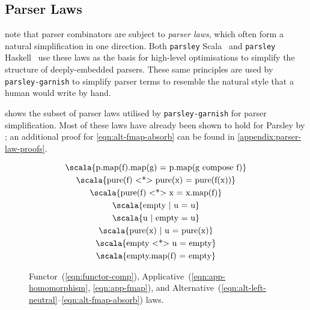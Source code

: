 \documentclass[../../../main.tex]{subfiles}
\begin{document}
\subsection{Parser Laws}
\textcite{willis_staged_2023} note that parser combinators are subject to \emph{parser laws}, which often form a natural simplification in one direction.
Both \texttt{parsley} Scala~\cite{willis_garnishing_2018} and \texttt{parsley} Haskell~\cite{willis_parsley_2023} use these laws as the basis for high-level optimisations to simplify the structure of deeply-embedded parsers.
These same principles are used by \texttt{parsley-garnish} to simplify parser terms to resemble the natural style that a human would write by hand.

 shows the subset of parser laws utilised by \texttt{parsley-garnish} for parser simplification.
Most of these laws have already been shown to hold for Parsley by \textcite{willis_garnishing_2018}; an additional proof for \cref{eqn:alt-fmap-absorb} can be found in \cref{appendix:parser-law-proofs}.

\begin{figure}[htbp]
\centering
\begin{gather}
  \text{\scala{p.map(f).map(g) = p.map(g compose f)}} \label{eqn:functor-comp} \\
  \text{\scala{pure(f) <*> pure(x) = pure(f(x))}} \label{eqn:app-homomorphism} \\
  \text{\scala{pure(f) <*> x = x.map(f)}} \label{eqn:app-fmap} \\
  \text{\scala{empty | u = u}} \label{eqn:alt-left-neutral} \\
  \text{\scala{u | empty = u}} \label{eqn:alt-right-neutral} \\
  \text{\scala{pure(x) | u = pure(x)}} \label{eqn:alt-left-biased-choice} \\
  \text{\scala{empty <*> u = empty}} \label{eqn:alt-empty-absorb} \\
  \text{\scala{empty.map(f) = empty}} \label{eqn:alt-fmap-absorb}
\end{gather}
\caption{Functor~(\ref{eqn:functor-comp}), Applicative~(\ref{eqn:app-homomorphism}, \ref{eqn:app-fmap}), and Alternative~(\ref{eqn:alt-left-neutral}--\ref{eqn:alt-fmap-absorb}) laws.}
\label{fig:parser-laws}
\end{figure}
\end{document}
